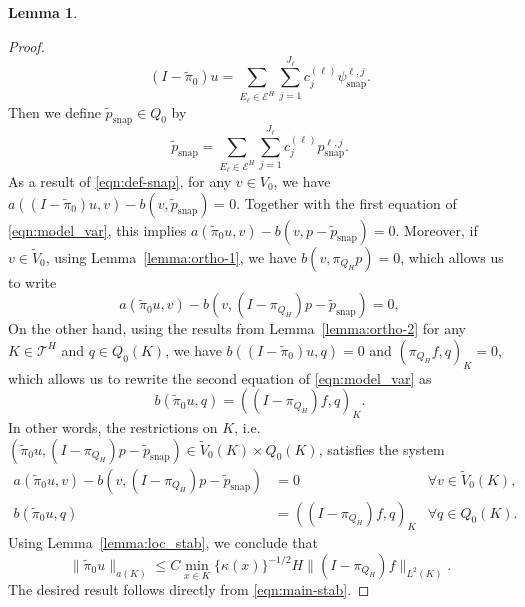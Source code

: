 \documentclass{article}[11pt]
\theoremstyle{definition}
\newtheorem{lemma}{Lemma}[section]
\begin{document}
\begin{lemma}
\begin{proof}
\[
(I-\tilde{\pi}_0)u = 
\sum_{E_\ell \in \mathcal{E}^H} \sum_{j=1}^{J_\ell} 
c_{j}^{(\ell)} \psi_{\text{snap}}^{\ell, j}.
\]
Then we define $\tilde{p}_{\text{snap}} \in Q_0$ by 
\[
\tilde{p}_{\text{snap}} = 
\sum_{E_\ell \in \mathcal{E}^H} \sum_{j=1}^{J_\ell} 
c_{j}^{(\ell)} p_{\text{snap}}^{\ell, j}.
\]
As a result of \eqref{eqn:def-snap}, for any $v \in V_0$, we have 
$a\left((I-\tilde{\pi}_0)u, v\right) - b(v, \tilde{p}_{\text{snap}}) = 0$. 
Together with the first equation of \eqref{eqn:model_var}, this implies  
$a(\tilde{\pi}_0 u, v) - b(v, p - \tilde{p}_{\text{snap}}) = 0$.
Moreover, if $v \in \tilde{V}_0$, using Lemma~\ref{lemma:ortho-1}, we have 
$b(v, \pi_{Q_H}p) = 0$, which allows us to write 
\begin{equation}\label{eqn:loc-1}
a(\tilde{\pi}_0 u, v) - b(v, (I-\pi_{Q_H})p - \tilde{p}_{\text{snap}}) = 0, 
\end{equation}
On the other hand, using the results from Lemma~\ref{lemma:ortho-2}
for any $K \in \mathcal{T}^H$ and $q \in Q_0(K)$, we have 
$b((I-\tilde{\pi}_0) u, q) = 0$ and $(\pi_{Q_H} f, q)_K = 0$, which allows us to rewrite 
the second equation of \eqref{eqn:model_var} as 
\begin{equation}\label{eqn:loc-2}
b(\tilde{\pi}_0 u, q) = ((I - \pi_{Q_H}) f, q)_K. 
\end{equation}
In other words, the restrictions on $K$, i.e. 
$(\tilde{\pi}_0 u, (I-\pi_{Q_H})p - \tilde{p}_{\text{snap}}) \in \tilde{V}_0(K) \times Q_0(K)$, 
satisfies the system 
\begin{equation}
\label{eqn:loc}
\begin{aligned}
a(\tilde{\pi}_0 u,v) -b(v,(I-\pi_{Q_H})p - \tilde{p}_{\text{snap}}) & = 0 & \forall v\in \tilde{V}_{0}(K), \\
b(\tilde{\pi}_0 u,q) & = ((I - \pi_{Q_H}) f, q)_K & \forall q\in Q_{0}(K).
\end{aligned}
\end{equation}
Using Lemma~\ref{lemma:loc_stab}, we conclude that 
\[
\| \tilde{\pi}_0 u \|_{a(K)}\leq C\min_{x\in K}\{\kappa(x)\}^{-1/2}H\| (I - \pi_{Q_H})f \|_{L^{2}(K)}.
\]
The desired result follows directly from \eqref{eqn:main-stab}. 
\end{proof}
\end{lemma}
\end{document}
